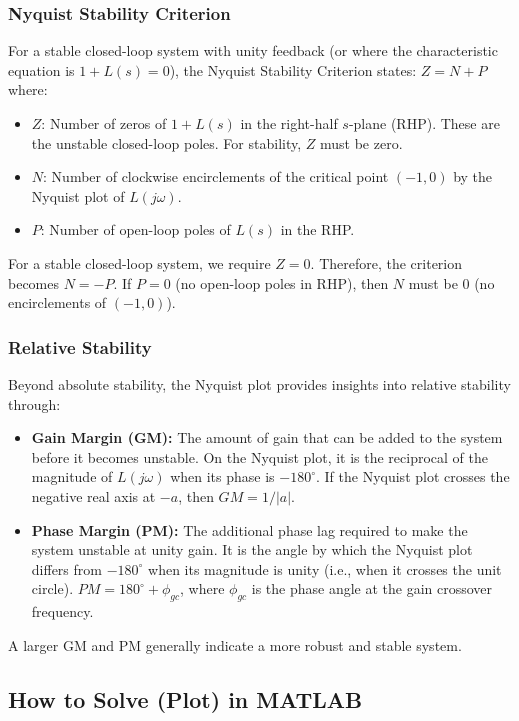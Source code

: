 \documentclass[a4paper,12pt]{article}
\begin{document}
	\subsubsection*{Nyquist Stability Criterion}
	For a stable closed-loop system with unity feedback (or where the characteristic equation is $1 + L(s) = 0$), the Nyquist Stability Criterion states:
	$Z = N + P$
	where:
	\begin{itemize}
		\item $Z$: Number of zeros of $1 + L(s)$ in the right-half $s$-plane (RHP). These are the unstable closed-loop poles. For stability, $Z$ must be zero.
		\item $N$: Number of clockwise encirclements of the critical point $(-1, 0)$ by the Nyquist plot of $L(j\omega)$.
		\item $P$: Number of open-loop poles of $L(s)$ in the RHP.
	\end{itemize}
	For a stable closed-loop system, we require $Z=0$. Therefore, the criterion becomes $N = -P$. If $P=0$ (no open-loop poles in RHP), then $N$ must be $0$ (no encirclements of $(-1,0)$).
	
	\subsubsection*{Relative Stability}
	Beyond absolute stability, the Nyquist plot provides insights into relative stability through:
	\begin{itemize}
		\item \textbf{Gain Margin (GM):} The amount of gain that can be added to the system before it becomes unstable. On the Nyquist plot, it is the reciprocal of the magnitude of $L(j\omega)$ when its phase is $-180^\circ$. If the Nyquist plot crosses the negative real axis at $-a$, then $GM = 1/|a|$.
		\item \textbf{Phase Margin (PM):} The additional phase lag required to make the system unstable at unity gain. It is the angle by which the Nyquist plot differs from $-180^\circ$ when its magnitude is unity (i.e., when it crosses the unit circle). $PM = 180^\circ + \phi_{gc}$, where $\phi_{gc}$ is the phase angle at the gain crossover frequency.
	\end{itemize}
	A larger GM and PM generally indicate a more robust and stable system.
	
	\subsection*{How to Solve (Plot) in MATLAB}
	
\end{document}

